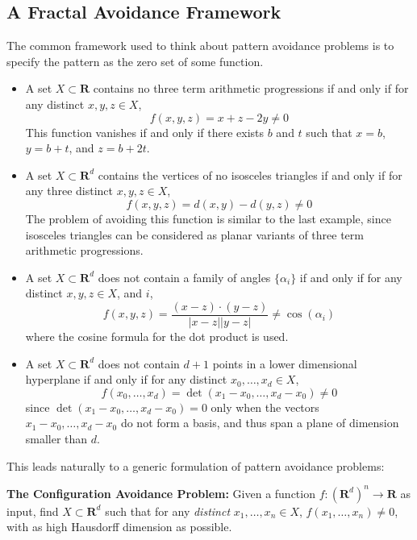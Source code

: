\documentclass{article}
\theoremstyle{plain}
\theoremstyle{plain}
\begin{document}
\begin{multicols}{2}
\section{A Fractal Avoidance Framework}

The common framework used to think about pattern avoidance problems is to specify the pattern as the zero set of some function.
%
\begin{itemize}
	\item A set $X \subset \mathbf{R}$ contains no three term arithmetic progressions if and only if for any distinct $x,y,z \in X$,
	\[ f(x,y,z) = x + z - 2y \neq 0  \]
	This function vanishes if and only if there exists $b$ and $t$ such that $x = b$, $y = b+t$, and $z = b+2t$.

	\item A set $X \subset \mathbf{R}^d$ contains the vertices of no isosceles triangles if and only if for any three distinct $x,y,z \in X$,
	\[ f(x,y,z) = d(x,y) - d(y,z) \neq 0 \]
	The problem of avoiding this function is similar to the last example, since isosceles triangles can be considered as planar variants of three term arithmetic progressions.

	\item A set $X \subset \mathbf{R}^d$ does not contain a family of angles $\{ \alpha_i \}$ if and only if for any distinct $x,y,z \in X$, and $i$,
	\[ f(x,y,z) = \frac{(x - z) \cdot (y - z)}{|x - z||y - z|} \neq \cos(\alpha_i) \]
	where the cosine formula for the dot product is used.

	\item A set $X \subset \mathbf{R}^d$ does not contain $d+1$ points in a lower dimensional hyperplane if and only if for any distinct $x_0, \dots, x_d \in X$,
	\[ f(x_0, \dots, x_d) = \det(x_1 - x_0, \dots, x_d - x_0) \neq 0 \]
	since $\det(x_1 - x_0, \dots, x_d - x_0) = 0$ only when the vectors $x_1 - x_0, \dots, x_d - x_0$ do not form a basis, and thus span a plane of dimension smaller than $d$.
\end{itemize}
%
This leads naturally to a generic formulation of pattern avoidance problems:

\begin{changemargin}{0.5em}{0em}
{\bf The Configuration Avoidance Problem:} Given a function $f: (\mathbf{R}^d)^n \to \mathbf{R}$ as input, find $X \subset \mathbf{R}^d$ such that for any {\it distinct} $x_1, \dots, x_n \in X$, $f(x_1, \dots, x_n) \neq 0$, with as high Hausdorff dimension as possible.
\end{changemargin}


\end{multicols}
\end{document}
